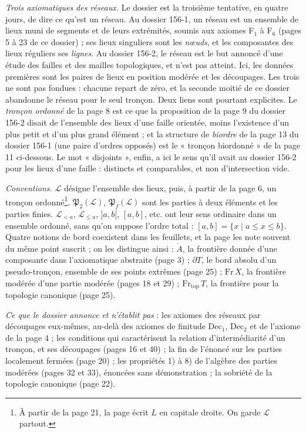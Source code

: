\documentclass[11pt,a4paper]{article}
\begin{document}
\emph{Trois axiomatiques des réseaux.} Le dossier est la troisième tentative,
en quatre jours, de dire ce qu'est un réseau. Au dossier 156-1, un réseau est un
ensemble de lieux muni de segments et de leurs extrémités, soumis aux axiomes
F$_1$ à F$_6$ (pages 5 à 23 de ce dossier) ; ses lieux singuliers sont les
\emph{nœuds}, et les composantes des lieux réguliers ses \emph{lignes}. Au
dossier 156-2, le réseau est le but annoncé d'une étude des failles et des
mailles topologiques, et n'est pas atteint. Ici, les données premières sont les
paires de lieux en position modérée et les découpages. Les trois ne sont pas
fondues : chacune repart de zéro, et la seconde moitié de ce dossier abandonne
le réseau pour le seul tronçon. Deux liens sont pourtant explicites. Le
\emph{tronçon ordonné} de la page 8 est ce que la proposition de la
page 9 du dossier 156-2 disait de l'ensemble des lieux d'une faille orientée,
moins l'existence d'un plus petit et d'un plus grand élément ; et la structure
de \emph{biordre} de la page 13 du dossier 156-1 (une paire d'ordres
opposés) est le « tronçon biordonné » de la page 11 ci-dessous. Le mot
« disjoints », enfin, a ici le sens qu'il avait au dossier 156-2 pour les
lieux d'une faille : distincts et comparables, et non d'intersection vide.

\emph{Conventions.} $\mathcal{L}$ désigne l'ensemble des lieux, puis, à partir
de la page 6, un tronçon ordonné\footnote{À partir de la page 21, la page écrit
$L$ en capitale droite. On garde $\mathcal{L}$ partout.}.
$\mathfrak{P}_{2}(\mathcal{L})$, $\mathfrak{P}_{f}(\mathcal{L})$ sont les parties
à deux éléments et les parties finies. $\mathcal{L}_{<a}$, $\mathcal{L}_{\leq a}$,
$]a,b[$, $[a,b]$, etc. ont leur sens ordinaire dans un ensemble ordonné, sans
qu'on suppose l'ordre total : $[a,b] = \{x \mid a \leq x \leq b\}$. Quatre
notions de bord coexistent dans les feuillets, et la page les note souvent du
même point suscrit ; on les distingue ainsi : $\dot{A}$, la frontière donnée
d'une composante dans l'axiomatique abstraite (page 3) ; $\partial T$, le bord
absolu d'un pseudo-tronçon, ensemble de ses points extrêmes (page 25) ;
$\mathrm{Fr}\, X$, la frontière modérée d'une partie modérée (pages 18 et 29) ;
$\mathrm{Fr}_{\mathrm{top}}\, T$, la frontière pour la topologie canonique
(page 25).

\emph{Ce que le dossier annonce et n'établit pas} : les axiomes des réseaux
par découpages eux-mêmes, au-delà des axiomes de finitude Dec$_1$, Dec$_2$ et de
l'axiome de la page 4 ; les conditions qui caractérisent la relation
d'intermédiarité d'un tronçon, et ses découpages (pages 16 et 40) ; la fin de
l'énoncé sur les parties localement fermées (page 20) ; les propriétés 1) à 8)
de l'algèbre des parties modérées (pages 32 et 33), énoncées sans
démonstration ; la sobriété de la topologie canonique (page 22).
\end{document}
